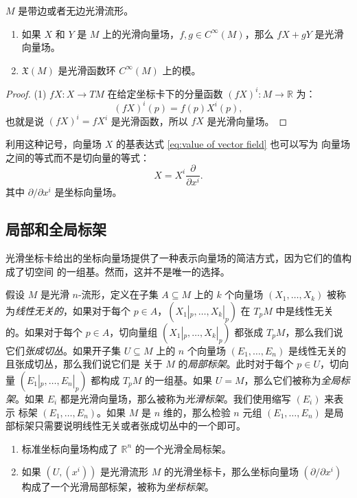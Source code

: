 \documentclass[fontset=none]{Notes}
\begin{document}
\begin{proposition}
  $M$ 是带边或者无边光滑流形。
  \begin{enumerate}
    \item 如果 $X$ 和 $Y$ 是 $M$ 上的光滑向量场，$f,g\in C^\infty(M)$，那么
    $fX+gY$ 是光滑向量场。
    \item $\mathfrak X(M)$ 是光滑函数环 $C^\infty(M)$ 上的模。
  \end{enumerate}
\end{proposition}
\begin{proof}
  (1) $fX:X\to TM$ 在给定坐标卡下的分量函数 $(fX)^i:M\to \mathbb{R}$ 为：
  \[
    (fX)^i(p)=f(p)X^i(p),
  \]
  也就是说 $(fX)^i=fX^i$ 是光滑函数，所以 $fX$ 是光滑向量场。
\end{proof}

利用这种记号，向量场 $X$ 的基表达式 \eqref{eq:value of vector field} 也可以写为
向量场之间的等式而不是切向量的等式：
\[
  X=X^i\frac{\partial }{\partial x^i}.
\]
其中 $\partial/\partial x^i$ 是坐标向量场。

\subsection{局部和全局标架}

光滑坐标卡给出的坐标向量场提供了一种表示向量场的简洁方式，因为它们的值构成了切空间
的一组基。然而，这并不是唯一的选择。

假设 $M$ 是光滑 $n$-流形，定义在子集 $A\subseteq M$ 上的 $k$ 个向量场 $(X_1,\dots,X_k)$
被称为\emph{线性无关的}，如果对于每个 $p\in A$，$\left(X_1|_p,\dots,X_k|_p\right)$
在 $T_pM$ 中是线性无关的。如果对于每个 $p\in A$，切向量组 $\left(X_1|_p,\dots,X_k|_p\right)$
都张成 $T_pM$，那么我们说它们\emph{张成切丛}。如果开子集 $U\subseteq M$ 上的
$n$ 个向量场 $(E_1,\dots,E_n)$ 是线性无关的且张成切丛，那么我们说它们是
关于 $M$ 的\emph{局部标架}。此时对于每个 $p\in U$，切向量 $\left(E_1|_p,\dots,E_n|_p\right)$
都构成 $T_pM$ 的一组基。如果 $U=M$，那么它们被称为\emph{全局标架}。如果
$E_i$ 都是光滑向量场，那么被称为\emph{光滑标架}。我们使用缩写 $(E_i)$ 来表示
标架 $(E_1,\dots,E_n)$。如果 $M$ 是 $n$ 维的，那么检验 $n$ 元组
$(E_1,\dots,E_n)$ 是局部标架只需要说明线性无关或者张成切丛中的一个即可。

\begin{example}[局部和全局标架]\mbox{}
  \begin{enumerate}
    \item 标准坐标向量场构成了 $\mathbb{R}^n$ 的一个光滑全局标架。
    \item 如果 $(U,(x^i))$ 是光滑流形 $M$ 的光滑坐标卡，那么坐标向量场
    $\left(\partial/\partial x^i\right)$ 构成了一个光滑局部标架，被称为\emph{坐标标架}。
  \end{enumerate}
\end{example}
\end{document}
